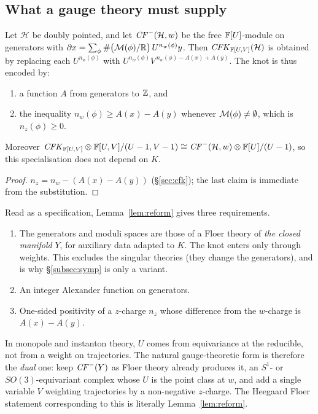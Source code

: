 \subsection{What a gauge theory must supply}\label{subsec:requirements}
\begin{lemma}\label{lem:reform}
Let $\mathcal H$ be doubly pointed, and let $\mathit{CF}^-(\mathcal H,w)$ be the free $\mathbb{F}[U]$-module on generators with
$\partial x=\sum_\phi\#\big(\mathcal{M}(\phi)/\mathbb{R}\big)\,U^{n_w(\phi)}y$.  Then $\mathit{CFK}_{\mathbb{F}[U,V]}(\mathcal H)$ is obtained by
replacing each $U^{n_w(\phi)}$ with $U^{n_w(\phi)}V^{\,n_w(\phi)-A(x)+A(y)}$.  The knot is thus encoded by:
\begin{enumerate}[label=(\roman*)]
\item a function $A$ from generators to $\mathbb{Z}$, and
\item the inequality $n_w(\phi)\ge A(x)-A(y)$ whenever $\mathcal{M}(\phi)\ne\emptyset$, which is $n_z(\phi)\ge0$.
\end{enumerate}
Moreover $\mathit{CFK}_{\mathbb{F}[U,V]}\otimes\mathbb{F}[U,V]/(U-1,V-1)\cong\mathit{CF}^-(\mathcal H,w)\otimes\mathbb{F}[U]/(U-1)$, so this specialisation does
not depend on $K$.
\end{lemma}
\begin{proof}
$n_z=n_w-(A(x)-A(y))$ (\S\ref{sec:cfk}); the last claim is immediate from the substitution.
\end{proof}

Read as a specification, Lemma~\ref{lem:reform} gives three requirements.
\begin{enumerate}[label=(Q\arabic*),leftmargin=2.6em]
\item\label{Q:base} The generators and moduli spaces are those of a Floer theory of \emph{the closed manifold} $Y$,
for auxiliary data adapted to $K$.  The knot enters only through weights.  This excludes the singular theories
(they change the generators), and is why \S\ref{subsec:symp} is only a variant.
\item\label{Q:alex} An integer Alexander function on generators.
\item\label{Q:pos} One-sided positivity of a $z$-charge $n_z$ whose difference from the $w$-charge is
$A(x)-A(y)$.
\end{enumerate}
In monopole and instanton theory, $U$ comes from equivariance at the reducible, not from a weight on
trajectories.  The natural gauge-theoretic form is therefore the \emph{dual} one: keep $\mathit{CF}^-(Y)$ as Floer theory
already produces it, an $S^1$- or $SO(3)$-equivariant complex whose $U$ is the point class at $w$, and add a single
variable $V$ weighting trajectories by a non-negative $z$-charge.  The Heegaard Floer statement corresponding to
this is literally Lemma~\ref{lem:reform}.

